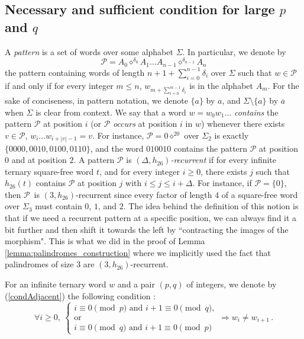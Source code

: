 \documentclass[12pt]{article}
\theoremstyle{definition}
\newcommand{\patternprime}[3]{{#1}\diamond^{#2}{#3}}
\begin{document}
\subsection{Necessary and sufficient condition for large $p$ and $q$}

A \emph{pattern} is a set of words over some alphabet $\Sigma$. In particular, we denote by 
$$\mathcal{P} = \patternprime{A_0}{\delta_0}{A_1} \dots \patternprime{A_{n - 1}}{\delta_{n-1}}{A_n}$$ 
the pattern containing words of length $n + 1 + \sum_{i = 0}^{n-1}\delta_i$ over $\Sigma$ such that $w \in \mathcal{P}$ if and only if for every integer $m \le n$, $w_{m+\sum_{i = 0}^{m-1}\delta_i}$ is in the alphabet $A_m$. For the sake of conciseness, in pattern notation, we denote $\{a\}$ by $a$, and $\Sigma \setminus\{ a\}$ by $\overline{a}$ when $\Sigma$ is clear from context. We say that a word $w=w_0w_1\ldots$ \emph{contains} the pattern $\mathcal{P}$ at position $i$ (or  $\mathcal{P}$ \emph{occurs} at position $i$ in $w$) whenever there exists $v \in \mathcal{P}$, $w_i\dots w_{i + |v| - 1} = v$. For instance, $\mathcal{P} = 0\diamond^20$ over $\Sigma_2$
is exactly $\{0000, 0010, 0100, 0110\}$, and the word $010010$ contains the pattern $\mathcal{P}$ at position $0$ and at position $2$.
A pattern $\mathcal{P}$ is \emph{$(\Delta, h_{26})$-recurrent} if for every infinite ternary square-free word $t$, and for every integer $i \ge 0$, there exists $j$ such that $h_{26}(t)$ contains $\mathcal{P}$ at position $j$ with $i \le j \le i + \Delta$.
For instance, if $\mathcal{P} = \{0\}$, then $\mathcal{P}$~is $(3, h_{26})$-recurrent since every factor of length $4$ of a square-free word over $\Sigma_3$ must contain $0$, $1$, and $2$.
The idea behind the definition of this notion is that if we need a recurrent pattern at a specific position, we can always find it a bit further and then shift it towards the left by ``contracting the images of the morphism". This is what we did in the proof of Lemma \ref{lemma:palindromes_construction} where we implicitly used the fact that palindromes of size 3 are $(3, h_{26})$-recurrent.

For an infinite ternary word $w$ and a pair $(p, q)$ of integers, we denote by (\ref{condAdjacent}) the following condition :
\begin{equation}\label{condAdjacent}
\forall i \ge 0,\ 
\begin{cases}
i \equiv 0 \pmod{p} \text{ and } i+1 \equiv 0 \pmod{q}, \\
\text{or} \\
i \equiv 0 \pmod{q} \text{ and } i+1 \equiv 0 \pmod{p}
\end{cases}
\Rightarrow w_i \neq w_{i+1}\,. \tag{\textasteriskcentered}
\end{equation}
\end{document}
